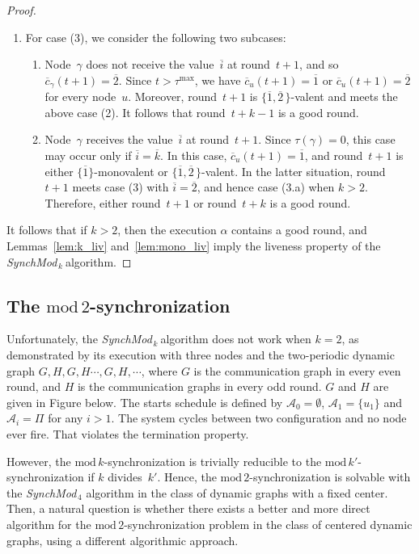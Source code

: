 \documentclass{article}
\newcommand{\cent}{\gamma}
\newcommand{\try}{\tau}
\newcommand{\SM}{{\em SynchMod}$_{\,k}\ $}
\begin{document}
\begin{proof}
\begin{enumerate}
\item For case (3),  we consider the following two subcases:
\begin{enumerate}
\item Node~$\cent$ does not receive the value~$ \overline{i} $ at round~$t+1$, and so $ \overline{c}_{\cent}(t + 1)  = \overline{ 2 } $.
Since  $t> \try^{\max} $, we have $  \overline{c}_{u}(t + 1)  = \overline{ 1 } $ or $  \overline{c}_{u}(t + 1)  = \overline{ 2 } $ 
	for every node~$u$.
Moreover, round~$t+1$ is $ \{\overline{1} , \overline{2} \, \}$-valent and meets the above case (2).
It follows that round~$t +k-1$ is a good round.
\item Node~$\cent$ receives the value~$ \overline{i} $ at round~$t+1$.
Since $\try(\cent)= 0$, this case may occur only if $ \overline{i } = \overline{ k }$.
In this case, $  \overline{c}_{u}(t + 1)  = \overline{ 1 } $, and round~$t+1$ is either 
	$ \{\overline{1}\}$-monovalent or  $ \{\overline{1} , \overline{2} \, \}$-valent.
In the latter situation,  round~$t+1$ meets case (3) with $\overline{i}  =\overline{2} $, and hence case (3.a) when  $k>2$.
Therefore, either round~$t+1$ or round~$t+k$ is a good round.
\end{enumerate}
\end{enumerate}
It follows that if $k>2$, then the execution $\alpha$ contains a good round, and
	Lemmas~\ref{lem:k_liv} and~\ref{lem:mono_liv} imply the liveness property of the \SM algorithm.
\end{proof}

\subsection{The $\mathrm{mod}\,2$-synchronization}\label{sec:k=2}

Unfortunately, the \SM algorithm does not work when $k=2$, as demonstrated by its execution 
	with three nodes and the two-periodic dynamic graph 
	$G,H,G,H \cdots, G, H, \cdots$, where $G$ is the communication graph in every even round, and $H$ is the communication graphs in every odd round.
	$G$ and $H$ are given in Figure below.
	The starts schedule is defined by $\mathcal{A}_0 = \emptyset$, $\mathcal{A}_1 = \{u_1\}$ and $\mathcal{A}_i = \Pi$ for any $i>1$.
	The system cycles between two configuration and no node ever fire. That violates the termination property. 
	
However,  the $\mathrm{mod}\,k$-synchronization is trivially reducible to the $\mathrm{mod}\,k'$-synchronization 
	if $k$ divides~$k'$.
Hence, the $\mathrm{mod}\,2$-synchronization is solvable with the {\em SynchMod}$_{\,4}$ algorithm 
	in the class of dynamic  graphs with a fixed center.
Then, a  natural question is  whether there exists a better and more direct algorithm for the $\mathrm{mod}\,2$-synchronization
	problem in the class of  centered dynamic graphs, using a  different algorithmic approach. 
\end{document}
